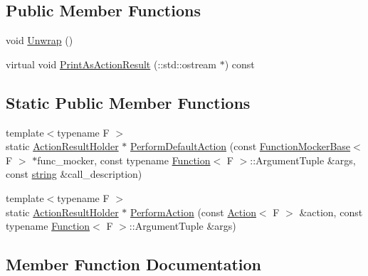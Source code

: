 \subsection*{Public Member Functions}
\begin{DoxyCompactItemize}
\item 
void \hyperlink{classtesting_1_1internal_1_1_action_result_holder_3_01void_01_4_aa57f371e1559b236e6424b2f50dcd6a2}{Unwrap} ()
\item 
virtual void \hyperlink{classtesting_1_1internal_1_1_action_result_holder_3_01void_01_4_ab829399d5a7d6fc9f0ecde0c0a6a3aeb}{Print\+As\+Action\+Result} (\+::std\+::ostream $\ast$) const
\end{DoxyCompactItemize}
\subsection*{Static Public Member Functions}
\begin{DoxyCompactItemize}
\item 
{\footnotesize template$<$typename F $>$ }\\static \hyperlink{classtesting_1_1internal_1_1_action_result_holder}{Action\+Result\+Holder} $\ast$ \hyperlink{classtesting_1_1internal_1_1_action_result_holder_3_01void_01_4_a140b6ab6a756e60db62e76b01b09a26f}{Perform\+Default\+Action} (const \hyperlink{classtesting_1_1internal_1_1_function_mocker_base}{Function\+Mocker\+Base}$<$ F $>$ $\ast$func\+\_\+mocker, const typename \hyperlink{structtesting_1_1internal_1_1_function}{Function}$<$ F $>$\+::Argument\+Tuple \&args, const \hyperlink{namespacetesting_1_1internal_a8e8ff5b11e64078831112677156cb111}{string} \&call\+\_\+description)
\item 
{\footnotesize template$<$typename F $>$ }\\static \hyperlink{classtesting_1_1internal_1_1_action_result_holder}{Action\+Result\+Holder} $\ast$ \hyperlink{classtesting_1_1internal_1_1_action_result_holder_3_01void_01_4_abb1d387e21341393e0c237ae7b02ee68}{Perform\+Action} (const \hyperlink{classtesting_1_1_action}{Action}$<$ F $>$ \&action, const typename \hyperlink{structtesting_1_1internal_1_1_function}{Function}$<$ F $>$\+::Argument\+Tuple \&args)
\end{DoxyCompactItemize}


\subsection{Member Function Documentation}
\mbox{\label{classtesting_1_1internal_1_1_action_result_holder_3_01void_01_4_abb1d387e21341393e0c237ae7b02ee68}} 
